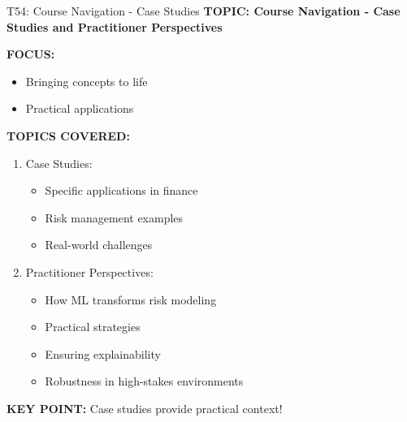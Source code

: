 \documentclass[8pt]{beamer}
\begin{document}
	\begin{frame}{T54: Course Navigation - Case Studies}
		\fontsize{6.5}{7.5}\selectfont
		\textbf{TOPIC: Course Navigation - Case Studies and Practitioner Perspectives}
		
		\vspace{0.1cm}
		\textbf{FOCUS:}
		\begin{itemize}
			\item Bringing concepts to life
			\item Practical applications
		\end{itemize}
		
		\vspace{0.1cm}
		\textbf{TOPICS COVERED:}
		\begin{enumerate}
			\item \textcolor{myblue}{Case Studies:}
			\begin{itemize}
				\item Specific applications in finance
				\item Risk management examples
				\item Real-world challenges
			\end{itemize}
			\item \textcolor{myblue}{Practitioner Perspectives:}
			\begin{itemize}
				\item How ML transforms risk modeling
				\item Practical strategies
				\item Ensuring explainability
				\item Robustness in high-stakes environments
			\end{itemize}
		\end{enumerate}
		
		\textcolor{myred}{\textbf{KEY POINT:}} Case studies provide \textcolor{myblue}{practical context}!
	\end{frame}
	
\end{document}
